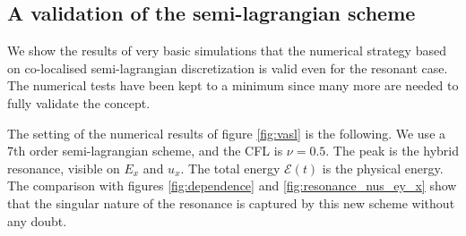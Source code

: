 

\FloatBarrier

\subsection{A validation of the semi-lagrangian scheme}

We show the results of very basic simulations that the numerical strategy 
based on co-localised semi-lagrangian discretization is valid even for the resonant 
case.
The numerical tests have been kept to a minimum since many more are needed to fully validate
the concept.

The setting of the numerical results of figure \ref{fig:vasl}
is the following. We use a 7th order semi-lagrangian scheme, and the CFL is $\nu=0.5$.
The peak is the hybrid resonance, visible on $E_x$ and $u_x$.
The total energy $\mathcal E(t)$ is the physical energy. 
The comparison with figures \ref{fig:dependence} and \ref{fig:resonance_nus_ey_x} show that the 
singular nature of the resonance is captured by this new scheme without any doubt.

